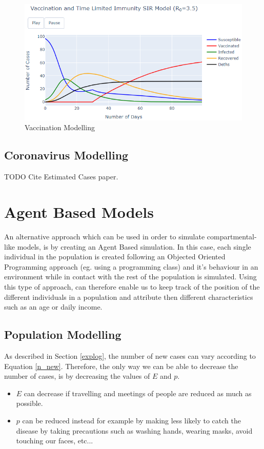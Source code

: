 \begin{figure}[ht!]%
    \centering
    \includegraphics[width=13cm]{latex/images/vacc.PNG}%
    \caption{Vaccination Modelling}
    \label{vacc}
\end{figure}

\subsection{Coronavirus Modelling}

TODO Cite Estimated Cases paper.

\section{Agent Based Models}
An alternative approach which can be used in order to simulate compartmental-like models, is by creating an Agent Based simulation. In this case, each single individual in the population is created following an Objected Oriented Programming approach (eg. using a programming class) and it's behaviour in an environment while in contact with the rest of the population is simulated. Using this type of approach, can therefore enable us to keep track of the position of the different individuals in a population and attribute then different characteristics such as an age or daily income.

\subsection{Population Modelling}

As described in Section \ref{explog}, the number of new cases can vary according to Equation \ref{n_new}. Therefore, the only way we can be able to decrease the number of cases, is by decreasing the values of $E$ and $p$. 
\begin{itemize}
    \setlength\itemsep{-0.3cm}
    \item $E$ can decrease if travelling and meetings of people are reduced as much as possible.
    \item $p$ can be reduced instead for example by making less likely to catch the disease by taking precautions such as washing hands, wearing masks, avoid touching our faces, etc...
\end{itemize}

